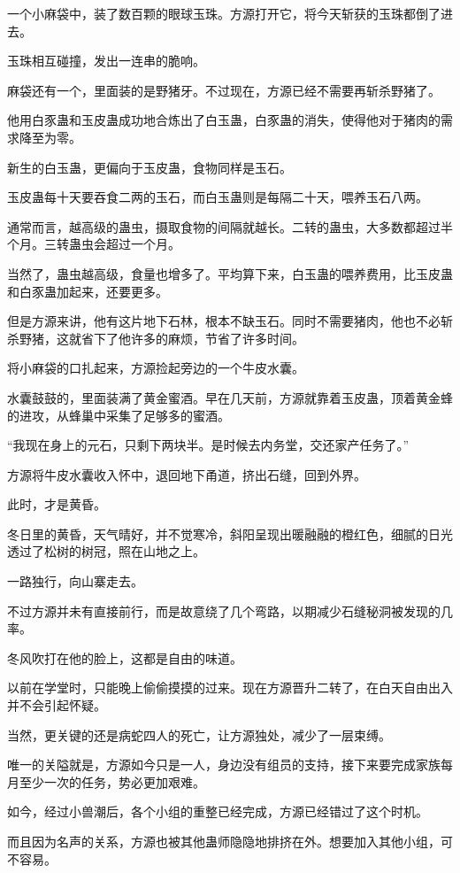 \begin{this_body}
一个小麻袋中，装了数百颗的眼球玉珠。方源打开它，将今天斩获的玉珠都倒了进去。

玉珠相互碰撞，发出一连串的脆响。

麻袋还有一个，里面装的是野猪牙。不过现在，方源已经不需要再斩杀野猪了。

他用白豕蛊和玉皮蛊成功地合炼出了白玉蛊，白豕蛊的消失，使得他对于猪肉的需求降至为零。

新生的白玉蛊，更偏向于玉皮蛊，食物同样是玉石。

玉皮蛊每十天要吞食二两的玉石，而白玉蛊则是每隔二十天，喂养玉石八两。

通常而言，越高级的蛊虫，摄取食物的间隔就越长。二转的蛊虫，大多数都超过半个月。三转蛊虫会超过一个月。

当然了，蛊虫越高级，食量也增多了。平均算下来，白玉蛊的喂养费用，比玉皮蛊和白豕蛊加起来，还要更多。

但是方源来讲，他有这片地下石林，根本不缺玉石。同时不需要猪肉，他也不必斩杀野猪，这就省下了他许多的麻烦，节省了许多时间。

将小麻袋的口扎起来，方源捡起旁边的一个牛皮水囊。

水囊鼓鼓的，里面装满了黄金蜜酒。早在几天前，方源就靠着玉皮蛊，顶着黄金蜂的进攻，从蜂巢中采集了足够多的蜜酒。

“我现在身上的元石，只剩下两块半。是时候去内务堂，交还家产任务了。”

方源将牛皮水囊收入怀中，退回地下甬道，挤出石缝，回到外界。

此时，才是黄昏。

冬日里的黄昏，天气晴好，并不觉寒冷，斜阳呈现出暖融融的橙红色，细腻的日光透过了松树的树冠，照在山地之上。

一路独行，向山寨走去。

不过方源并未有直接前行，而是故意绕了几个弯路，以期减少石缝秘洞被发现的几率。

冬风吹打在他的脸上，这都是自由的味道。

以前在学堂时，只能晚上偷偷摸摸的过来。现在方源晋升二转了，在白天自由出入并不会引起怀疑。

当然，更关键的还是病蛇四人的死亡，让方源独处，减少了一层束缚。

唯一的关隘就是，方源如今只是一人，身边没有组员的支持，接下来要完成家族每月至少一次的任务，势必更加艰难。

如今，经过小兽潮后，各个小组的重整已经完成，方源已经错过了这个时机。

而且因为名声的关系，方源也被其他蛊师隐隐地排挤在外。想要加入其他小组，可不容易。


\end{this_body}
